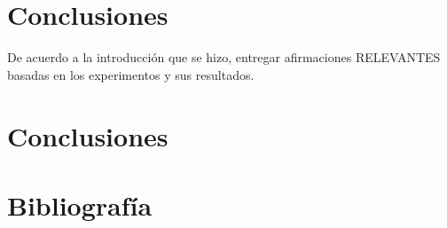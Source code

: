 \documentclass[letter, 10pt]{article}
\begin{document}
\section{Conclusiones}
De acuerdo a la introducci\'on que se hizo, entregar afirmaciones RELEVANTES basadas en los experimentos
y sus resultados.


\section{Conclusiones}
\section{Bibliograf\'ia}


\end{document}
